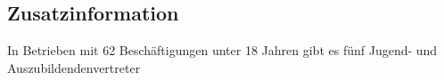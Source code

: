 \subsection{Zusatzinformation}
In Betrieben mit 62 Beschäftigungen unter 18 Jahren gibt es fünf Jugend- und Auszubildendenvertreter



